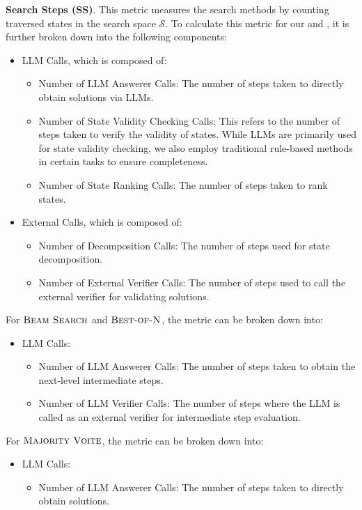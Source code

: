 \noindent\textbf{Search Steps (SS)}. This metric measures the search methods by counting traversed states in the search space $\mathcal{S}$.
To calculate this metric for our \method and \cmethod, it is further broken down into the following components:
\begin{itemize}[leftmargin=*]
    \item LLM Calls, {which is composed of}:
    \begin{itemize}
        \item Number of LLM Answerer Calls: The number of steps taken to directly obtain solutions via LLMs.
        \item Number of State Validity Checking Calls: This refers to the number of steps taken to verify the validity of states. While LLMs are primarily used for state validity checking, we also employ traditional rule-based methods in certain tasks to ensure completeness.
        \item Number of State Ranking Calls: The number of steps taken to rank states.
    \end{itemize}
    \item External Calls, {which is composed of}:
    \begin{itemize}
        \item Number of Decomposition Calls: The number of steps used for state decomposition.
        \item Number of External Verifier Calls: The number of steps used to call the external verifier for validating solutions.
    \end{itemize}
\end{itemize}

For $\textsc{Beam Search}$ and $\textsc{Best-of-N}$, the metric can be broken down into:
\begin{itemize}
    \item LLM Calls:
    \begin{itemize}[leftmargin=*]
    \item Number of LLM Answerer Calls: The number of steps taken to obtain the next-level intermediate steps.
    \item Number of LLM Verifier Calls: The number of steps where the LLM is called as an external verifier for intermediate step evaluation.
\end{itemize}
\end{itemize}

For $\textsc{Majority Voite}$, the metric can be broken down into:
\begin{itemize}
    \item LLM Calls:
    \begin{itemize}[leftmargin=*]
    \item Number of LLM Answerer Calls: The number of steps taken to directly obtain solutions.
    \end{itemize}
\end{itemize}

